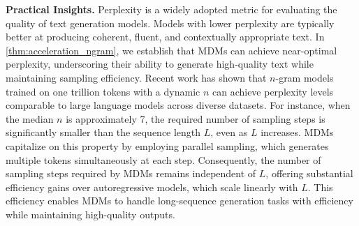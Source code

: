 \textbf{Practical Insights.} Perplexity is a widely adopted metric for evaluating the quality of text generation models. Models with lower perplexity are typically better at producing coherent, fluent, and contextually appropriate text. In \cref{thm:acceleration_ngram}, we establish that MDMs can achieve near-optimal perplexity, underscoring their ability to generate high-quality text while maintaining sampling efficiency. Recent work has shown that $n$-gram models trained on one trillion tokens with a dynamic $n$ can achieve perplexity levels comparable to large language models across diverse datasets. For instance, when the median $n$ is approximately 7, the required number of sampling steps is significantly smaller than the sequence length $L$, even as $L$ increases. MDMs capitalize on this property by employing parallel sampling, which generates multiple tokens simultaneously at each step. Consequently, the number of sampling steps required by MDMs remains independent of $L$, offering substantial efficiency gains over autoregressive models, which scale linearly with $L$. This efficiency enables MDMs to handle long-sequence generation tasks with efficiency while maintaining high-quality outputs. 